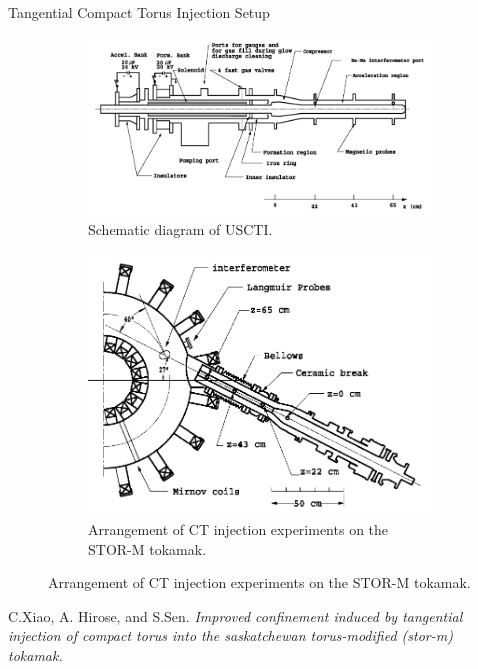 \begin{frame} {Tangential Compact Torus Injection Setup}
    \begin{figure}
        \centering
        \begin{subfigure}{0.6\textwidth}
            \centering
            \includegraphics[width=\textwidth]{figures/uscti.png}
            \caption{Schematic diagram of USCTI. \cite{xiao_2004_improved}}
            \label{fig:uscti}
        \end{subfigure}%
        \begin{subfigure}{0.4\textwidth}
            \centering
            \includegraphics[width=\textwidth]{figures/tangential-cti-setup.png}
            \caption{Arrangement of CT injection experiments on the STOR-M tokamak. \cite{xiao_2004_improved}}
            \label{fig:tangential-cti-setup}
        \end{subfigure}
    \end{figure}

    \tiny \cite{xiao_2004_improved} C.Xiao, A. Hirose, and S.Sen. \textit{Improved confinement induced by tangential injection of compact torus into the saskatchewan torus-modified (stor-m) tokamak.}
\end{frame}